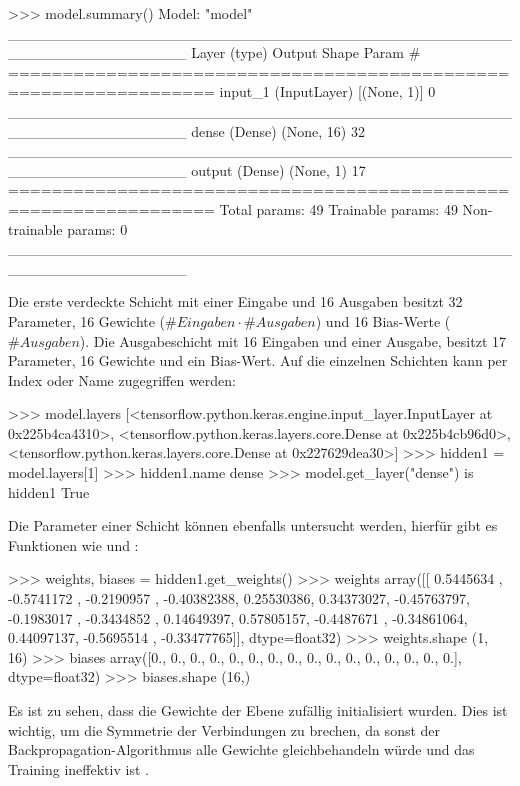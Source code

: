 \begin{pyconcode}
>>> model.summary()
Model: "model"
_________________________________________________________________
Layer (type)                 Output Shape              Param #   
=================================================================
input_1 (InputLayer)         [(None, 1)]               0         
_________________________________________________________________
dense (Dense)                (None, 16)                32        
_________________________________________________________________
output (Dense)               (None, 1)                 17        
=================================================================
Total params: 49
Trainable params: 49
Non-trainable params: 0
_________________________________________________________________
\end{pyconcode}
Die erste verdeckte Schicht mit einer Eingabe und 16 Ausgaben besitzt
32 Parameter, 16 Gewichte ($\#Eingaben \cdot \#Ausgaben$) und 16 Bias-Werte ($\#Ausgaben$).
Die Ausgabeschicht mit 16 Eingaben und einer Ausgabe, besitzt
17 Parameter, 16 Gewichte und ein Bias-Wert.
Auf die einzelnen Schichten kann per Index oder Name zugegriffen werden:
\begin{pyconcode}
>>> model.layers
[<tensorflow.python.keras.engine.input_layer.InputLayer at 0x225b4ca4310>,
 <tensorflow.python.keras.layers.core.Dense at 0x225b4cb96d0>,
 <tensorflow.python.keras.layers.core.Dense at 0x227629dea30>]
>>> hidden1 = model.layers[1]
>>> hidden1.name
dense
>>> model.get_layer("dense") is hidden1
True
\end{pyconcode}
Die Parameter einer Schicht können ebenfalls untersucht werden,
hierfür gibt es Funktionen wie
 und :
\begin{pyconcode}
>>> weights, biases = hidden1.get_weights()
>>> weights
array([[ 0.5445634 , -0.5741172 , -0.2190957 , -0.40382388,  0.25530386,
         0.34373027, -0.45763797, -0.1983017 , -0.3434852 ,  0.14649397,
         0.57805157, -0.4487671 , -0.34861064,  0.44097137, -0.5695514 ,
        -0.33477765]], dtype=float32)
>>> weights.shape
(1, 16)
>>> biases
array([0., 0., 0., 0., 0., 0., 0., 0., 0., 0., 0., 0., 0., 0., 0., 0.],
      dtype=float32)
>>> biases.shape
(16,)
\end{pyconcode}
Es ist zu sehen, dass die Gewichte der Ebene zufällig initialisiert wurden.
Dies ist wichtig, um die Symmetrie der Verbindungen zu brechen,
da sonst der Backpropagation-Algorithmus alle Gewichte gleichbehandeln würde
und das Training ineffektiv ist \parencite[291]{book:hands-on-ml}.
